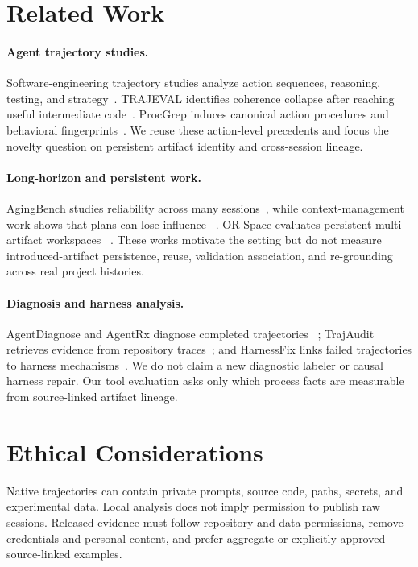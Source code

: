 \documentclass[letterpaper]{article}
\begin{document}
\section{Related Work}

\paragraph{Agent trajectory studies.}
Software-engineering trajectory studies analyze action sequences, reasoning,
testing, and strategy~\cite{bouzenia2025trajectories,mehtiyev2026behavioral}.
TRAJEVAL identifies coherence collapse after reaching useful intermediate
code~\cite{kim2026trajeval}.  ProcGrep induces canonical action procedures and
behavioral fingerprints~\cite{oderinwale2026procgrep}.  We reuse these
action-level precedents and focus the novelty question on persistent artifact
identity and cross-session lineage.

\paragraph{Long-horizon and persistent work.}
AgingBench studies reliability across many sessions~\cite{zhu2026aging}, while
context-management work shows that plans can lose influence
~\cite{mehta2026plans}.  OR-Space evaluates persistent multi-artifact workspaces
~\cite{zhou2026orspace}.  These works motivate the setting but do not measure
introduced-artifact persistence, reuse, validation association, and re-grounding across
real project histories.

\paragraph{Diagnosis and harness analysis.}
AgentDiagnose and AgentRx diagnose completed trajectories
~\cite{ou2025agentdiagnose,barke2026agentrx}; TrajAudit retrieves evidence from
repository traces~\cite{wang2026trajaudit}; and HarnessFix links failed
trajectories to harness mechanisms~\cite{chen2026harnessfix}.  We do not claim a
new diagnostic labeler or causal harness repair.  Our tool evaluation asks only
which process facts are measurable from source-linked artifact lineage.

\section{Ethical Considerations}

Native trajectories can contain private prompts, source code, paths, secrets,
and experimental data.  Local analysis does not imply permission to publish
raw sessions.  Released evidence must follow repository and data permissions,
remove credentials and personal content, and prefer aggregate or explicitly
approved source-linked examples.
\end{document}
